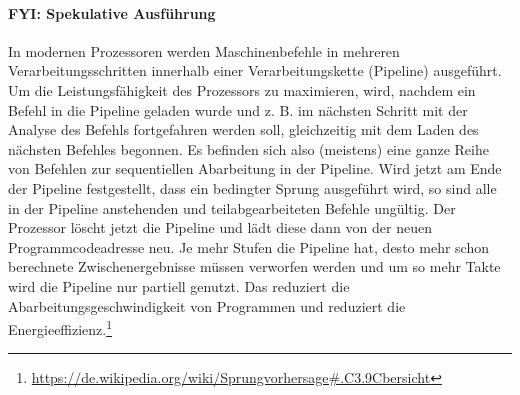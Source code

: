 \paragraph{FYI: Spekulative Ausführung}
In modernen Prozessoren werden Maschinenbefehle in mehreren Verarbeitungsschritten innerhalb einer Verarbeitungskette (Pipeline) ausgeführt. Um die Leistungsfähigkeit des Prozessors zu maximieren, wird, nachdem ein Befehl in die Pipeline geladen wurde und z. B. im nächsten Schritt mit der Analyse des Befehls fortgefahren werden soll, gleichzeitig mit dem Laden des nächsten Befehles begonnen. Es befinden sich also (meistens) eine ganze Reihe von Befehlen zur sequentiellen Abarbeitung in der Pipeline. Wird jetzt am Ende der Pipeline festgestellt, dass ein bedingter Sprung ausgeführt wird, so sind alle in der Pipeline anstehenden und teilabgearbeiteten Befehle ungültig. Der Prozessor löscht jetzt die Pipeline und lädt diese dann von der neuen Programmcodeadresse neu. Je mehr Stufen die Pipeline hat, desto mehr schon berechnete Zwischenergebnisse müssen verworfen werden und um so mehr Takte wird die Pipeline nur partiell genutzt. Das reduziert die Abarbeitungsgeschwindigkeit von Programmen und reduziert die Energieeffizienz.\footnote{\url{https://de.wikipedia.org/wiki/Sprungvorhersage\#.C3.9Cbersicht}}
